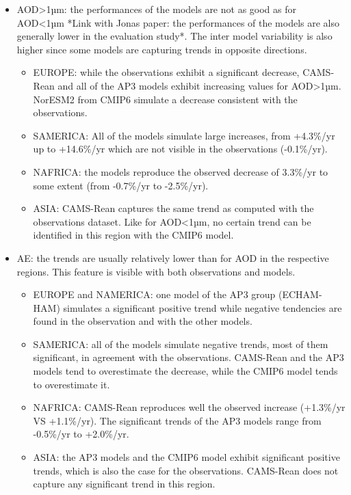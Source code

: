 \documentclass[journal abbreviation, manuscript]{copernicus}
\begin{document}
\begin{itemize}
\begin{itemize}
       \end{itemize}
 \item AOD>1µm: the performances of the models are not as good as for AOD<1µm *Link with Jonas paper: the performances of the models are also generally lower in the evaluation study*. The inter model variability is also higher since some models are capturing trends in opposite directions.
       \begin{itemize}
        \item EUROPE: while the observations exhibit a significant decrease, CAMS-Rean and all of the AP3 models exhibit increasing values for AOD>1µm. NorESM2 from CMIP6 simulate a decrease consistent with the observations.
        \item SAMERICA: All of the models simulate large increases, from +4.3\%/yr up to +14.6\%/yr  which are not visible in the observations (-0.1\%/yr).
        \item NAFRICA: the models reproduce the observed decrease of 3.3\%/yr to some extent (from -0.7\%/yr to -2.5\%/yr).
        \item ASIA: CAMS-Rean captures the same trend as computed with the observations dataset. Like for AOD<1µm, no certain trend can be identified  in this region with the CMIP6 model.
       \end{itemize}
 \item AE: the trends are usually relatively lower than for AOD in the respective regions. This feature is visible with both observations and models.
       \begin{itemize}
        \item EUROPE and NAMERICA: one model of the AP3 group (ECHAM-HAM) simulates a significant positive trend while negative tendencies are found in the observation and with the other models.
        \item SAMERICA: all of the models simulate negative trends, most of them significant, in agreement with the observations. CAMS-Rean and the AP3 models tend to overestimate the decrease, while the CMIP6 model tends to overestimate it.
        \item NAFRICA: CAMS-Rean reproduces well the observed increase (+1.3\%/yr VS +1.1\%/yr). The significant trends of the AP3 models range from -0.5\%/yr to +2.0\%/yr.
        \item ASIA: the AP3 models and the CMIP6 model exhibit significant positive trends, which is also the case for the observations. CAMS-Rean does not capture any significant trend in this region.
       \end{itemize}

\end{itemize}
\end{document}
